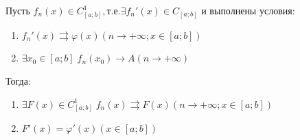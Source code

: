 \begin{Th}
	Пусть $f_n(x) \in C_{[a;b]}^{1}, \text{т.е.} \exists f_n'(x) \in C_{[a;b]}$ и выполнены условия:\\
	\begin{enumerate}
		\item $f_n'(x) \rightrightarrows \varphi (x) (n \to +\infty; x \in [a;b])$
		\item $\exists x_0 \in [a;b] \; f_n(x_0) \rightarrow A (n \to +\infty)$
	\end{enumerate}
	Тогда:
	\begin{enumerate}
		\item $\exists F(x) \in C_{[a;b]}^{1} \; f_n(x) \rightrightarrows F(x) (n \to +\infty; x \in [a;b])$
		\item $F'(x) = \varphi'(x) (x \in [a;b])$
	\end{enumerate}
\end{Th}

